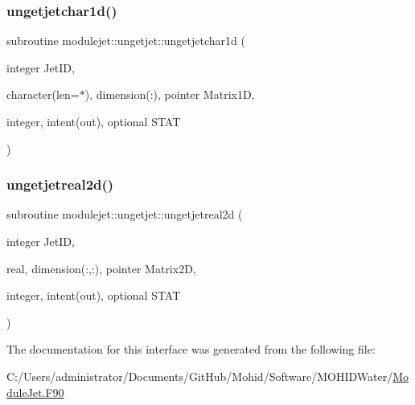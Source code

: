 \subsubsection{\texorpdfstring{ungetjetchar1d()}{ungetjetchar1d()}}
{\footnotesize\ttfamily subroutine modulejet\+::ungetjet\+::ungetjetchar1d (\begin{DoxyParamCaption}\item[{integer}]{Jet\+ID,  }\item[{character(len=$\ast$), dimension(\+:), pointer}]{Matrix1D,  }\item[{integer, intent(out), optional}]{S\+T\+AT }\end{DoxyParamCaption})\hspace{0.3cm}{\ttfamily [private]}}

\mbox{\label{interfacemodulejet_1_1ungetjet_a164d95daa5778f7867b70271bf4f37f5}} 
\subsubsection{\texorpdfstring{ungetjetreal2d()}{ungetjetreal2d()}}
{\footnotesize\ttfamily subroutine modulejet\+::ungetjet\+::ungetjetreal2d (\begin{DoxyParamCaption}\item[{integer}]{Jet\+ID,  }\item[{real, dimension(\+:,\+:), pointer}]{Matrix2D,  }\item[{integer, intent(out), optional}]{S\+T\+AT }\end{DoxyParamCaption})\hspace{0.3cm}{\ttfamily [private]}}



The documentation for this interface was generated from the following file\+:\begin{DoxyCompactItemize}
\item 
C\+:/\+Users/administrator/\+Documents/\+Git\+Hub/\+Mohid/\+Software/\+M\+O\+H\+I\+D\+Water/\mbox{\hyperlink{_module_jet_8_f90}{Module\+Jet.\+F90}}\end{DoxyCompactItemize}
